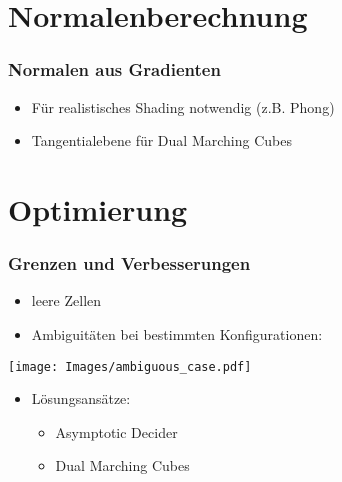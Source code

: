 \documentclass{beamer}
\begin{document}
\section{Normalenberechnung}
\begin{frame}
  \frametitle{Normalen aus Gradienten}
  \begin{itemize}
    \item Für realistisches Shading notwendig (z.B. Phong)
    \item Tangentialebene für Dual Marching Cubes
  \end{itemize}

  \begin{center}
\end{center}
  
\end{frame}

\section{Optimierung}
\begin{frame}[t]
  \frametitle{Grenzen und Verbesserungen}
  \begin{itemize}
    \item leere Zellen
    \item Ambiguitäten bei bestimmten Konfigurationen:
  \end{itemize}

  \begin{center}
  \texttt{[image: Images/ambiguous\_case.pdf]}
  \end{center}

  \begin{itemize}
    \item Lösungsansätze:
    \begin{itemize}
      \item Asymptotic Decider
      \item Dual Marching Cubes
    \end{itemize}
  \end{itemize}
\end{frame}
\end{document}

